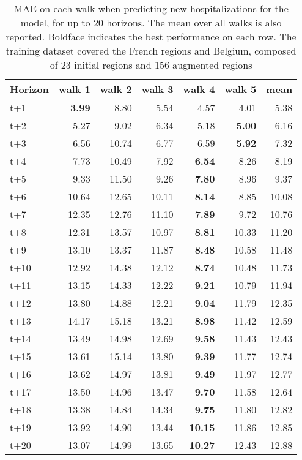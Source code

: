 \begin{table}[H]
\centering
\caption{MAE on each walk when predicting new hospitalizations for the model, for up to 20 horizons. The mean over all walks is also reported. Boldface indicates the best performance on each row. The training dataset covered the French regions and Belgium, composed of 23 initial regions and 156 augmented regions }
\label{tab:MAE_walk_dense_model}
\begin{tabular}{lrrrrrr}
\toprule
Horizon &  walk 1 &  walk 2 &  walk 3 &  walk 4 &  walk 5 &  mean \\
\midrule
t+1  & \textbf{3.99}  & 8.80  & 5.54  & 4.57  & 4.01  & 5.38  \\
t+2  & 5.27  & 9.02  & 6.34  & 5.18  & \textbf{5.00}  & 6.16  \\
t+3  & 6.56  & 10.74  & 6.77  & 6.59  & \textbf{5.92}  & 7.32  \\
t+4  & 7.73  & 10.49  & 7.92  & \textbf{6.54}  & 8.26  & 8.19  \\
t+5  & 9.33  & 11.50  & 9.26  & \textbf{7.80}  & 8.96  & 9.37  \\
t+6  & 10.64  & 12.65  & 10.11  & \textbf{8.14}  & 8.85  & 10.08  \\
t+7  & 12.35  & 12.76  & 11.10  & \textbf{7.89}  & 9.72  & 10.76  \\
t+8  & 12.31  & 13.57  & 10.97  & \textbf{8.81}  & 10.33  & 11.20  \\
t+9  & 13.10  & 13.37  & 11.87  & \textbf{8.48}  & 10.58  & 11.48  \\
t+10  & 12.92  & 14.38  & 12.12  & \textbf{8.74}  & 10.48  & 11.73  \\
t+11  & 13.15  & 14.33  & 12.22  & \textbf{9.21}  & 10.79  & 11.94  \\
t+12  & 13.80  & 14.88  & 12.21  & \textbf{9.04}  & 11.79  & 12.35  \\
t+13  & 14.17  & 15.18  & 13.21  & \textbf{8.98}  & 11.42  & 12.59  \\
t+14  & 13.49  & 14.98  & 12.69  & \textbf{9.58}  & 11.43  & 12.43  \\
t+15  & 13.61  & 15.14  & 13.80  & \textbf{9.39}  & 11.77  & 12.74  \\
t+16  & 13.62  & 14.97  & 13.81  & \textbf{9.49}  & 11.97  & 12.77  \\
t+17  & 13.50  & 14.96  & 13.47  & \textbf{9.70}  & 11.58  & 12.64  \\
t+18  & 13.38  & 14.84  & 14.34  & \textbf{9.75}  & 11.80  & 12.82  \\
t+19  & 13.92  & 14.90  & 13.44  & \textbf{10.15}  & 11.86  & 12.85  \\
t+20  & 13.07  & 14.99  & 13.65  & \textbf{10.27}  & 12.43  & 12.88  \\

\bottomrule
\end{tabular}
\end{table}
